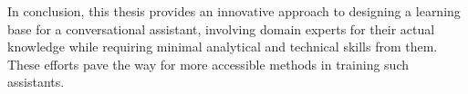 \begin{ThesisAbstract}
\begin{EnglishAbstract}
		In conclusion, this thesis provides an innovative approach to designing a learning base for a conversational assistant, involving domain experts for their actual knowledge while requiring minimal analytical and technical skills from them.
		These efforts pave the way for more accessible methods in training such assistants.

	\end{EnglishAbstract}

\end{ThesisAbstract}